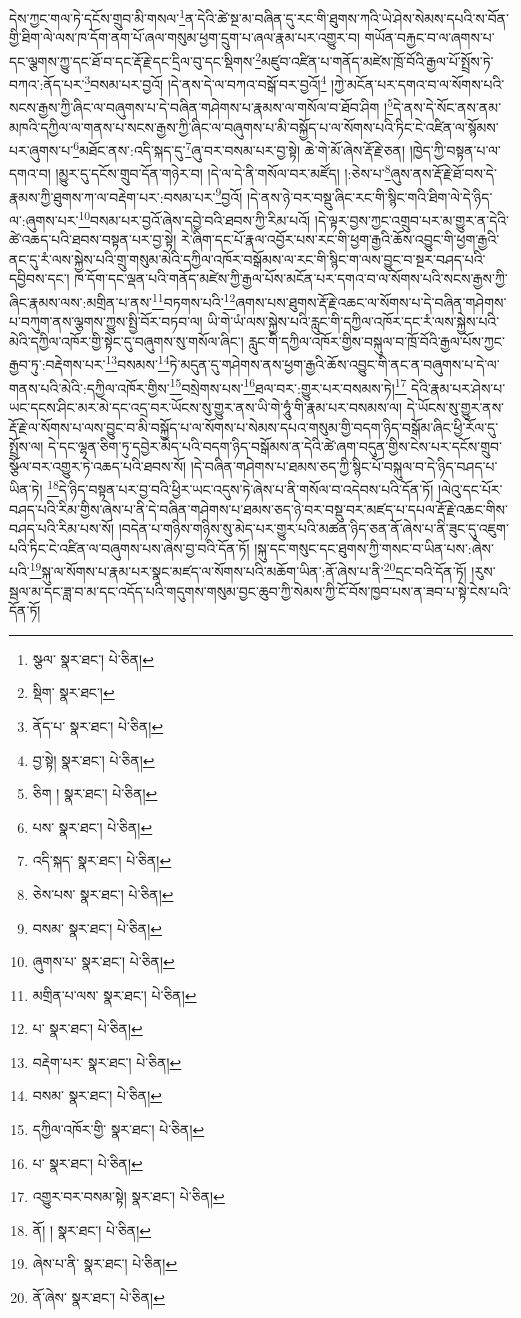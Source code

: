 དེས་ཀྱང་གལ་ཏེ་དངོས་གྲུབ་མི་གསལ་\footnote{སྩལ་  སྣར་ཐང་།  པེ་ཅིན། }ན་དེའི་ཚེ་སྔ་མ་བཞིན་དུ་རང་གི་ཐུགས་ཀའི་ཡེ་ཤེས་སེམས་དཔའི་ས་བོན་གྱི་ཐིག་ལེ་ལས་ཁ་དོག་ནག་པོ་ཞལ་གསུམ་ཕྱག་དྲུག་པ་ཞལ་རྣམ་པར་འགྱུར་བ། གཡོན་བརྐྱང་བ་ལ་ཞགས་པ་དང་ལྕགས་ཀྱུ་དང་ཐོ་བ་དང་རྡོ་རྗེ་དང་དྲིལ་བུ་དང་སྡིགས་\footnote{སྡིག་  སྣར་ཐང་། }མཛུབ་འཛིན་པ་གནོད་མཛེས་ཁྲོ་བོའི་རྒྱལ་པོ་སྤྲོས་ཏེ་བཀའ་:ནོད་པར་\footnote{ནོད་པ་  སྣར་ཐང་།  པེ་ཅིན། }བསམ་པར་བྱའོ། །དེ་ནས་དེ་ལ་བཀའ་བསྒོ་བར་བྱའོ།\footnote{བྱ་སྟེ།  སྣར་ཐང་།  པེ་ཅིན། } །ཀྱེ་མངོན་པར་དགའ་བ་ལ་སོགས་པའི་སངས་རྒྱས་ཀྱི་ཞིང་ལ་བཞུགས་པ་དེ་བཞིན་གཤེགས་པ་རྣམས་ལ་གསོལ་བ་ཐོབ་ཤིག །\footnote{ཅིག །  སྣར་ཐང་།  པེ་ཅིན། }དེ་ནས་དེ་སོང་ནས་ནམ་མཁའི་དཀྱིལ་ལ་གནས་པ་སངས་རྒྱས་ཀྱི་ཞིང་ལ་བཞུགས་པ་མི་བསྐྱོད་པ་ལ་སོགས་པའི་ཏིང་ངེ་འཛིན་ལ་སྙོམས་པར་ཞུགས་པ་\footnote{པས་  སྣར་ཐང་།  པེ་ཅིན། }མཐོང་ནས་:འདི་སྐད་དུ་\footnote{འདི་སྐད་  སྣར་ཐང་།  པེ་ཅིན། }ཞུ་བར་བསམ་པར་བྱ་སྟེ། ཆེ་གེ་མོ་ཞེས་རྡོ་རྗེ་ཅན། །ཁྱེད་ཀྱི་བསྟན་པ་ལ་དགའ་བ། །མྱུར་དུ་དངོས་གྲུབ་དོན་གཉེར་བ། །དེ་ལ་དེ་ནི་གསོལ་བར་མཛོད། །:ཅེས་པ་\footnote{ཅེས་པས་  སྣར་ཐང་།  པེ་ཅིན། }ཞུས་ནས་རྡོ་རྗེ་ཐོ་བས་དེ་རྣམས་ཀྱི་ཐུགས་ཀ་ལ་བརྡེག་པར་:བསམ་པར་\footnote{བསམ་  སྣར་ཐང་།  པེ་ཅིན། }བྱའོ། །དེ་ནས་ཉེ་བར་བསྡུ་ཞིང་རང་གི་སྙིང་གའི་ཐིག་ལེ་དེ་ཉིད་ལ་:ཞུགས་པར་\footnote{ཞུགས་པ་  སྣར་ཐང་།  པེ་ཅིན། }བསམ་པར་བྱའོ་ཞེས་དབྱེ་བའི་ཐབས་ཀྱི་རིམ་པའོ། །དེ་ལྟར་བྱས་ཀྱང་འགྲུབ་པར་མ་གྱུར་ན་དེའི་ཚེ་འཆད་པའི་ཐབས་བསྟན་པར་བྱ་སྟེ། རེ་ཞིག་དང་པོ་རྣལ་འབྱོར་པས་རང་གི་ཕྱག་རྒྱའི་ཆོས་འབྱུང་གི་ཕྱག་རྒྱའི་ནང་དུ་རཾ་ལས་སྐྱེས་པའི་གྲུ་གསུམ་མེའི་དཀྱིལ་འཁོར་བསྒོམས་ལ་རང་གི་སྙིང་ག་ལས་བྱུང་བ་སྔར་བཤད་པའི་དབྱིབས་དང་། ཁ་དོག་དང་ལྡན་པའི་གནོད་མཛེས་ཀྱི་རྒྱལ་པོས་མངོན་པར་དགའ་བ་ལ་སོགས་པའི་སངས་རྒྱས་ཀྱི་ཞིང་རྣམས་ལས་:མགྲིན་པ་ནས་\footnote{མགྲིན་པ་ལས་  སྣར་ཐང་།  པེ་ཅིན། }བཏགས་པའི་\footnote{པ་  སྣར་ཐང་།  པེ་ཅིན། }ཞགས་པས་ཐུགས་རྡོ་རྗེ་འཆང་ལ་སོགས་པ་དེ་བཞིན་གཤེགས་པ་བཀུག་ནས་ལྕགས་ཀྱུས་སྤྱི་བོར་བཏབ་ལ། ཡི་གེ་ཡཾ་ལས་སྐྱེས་པའི་རླུང་གི་དཀྱིལ་འཁོར་དང་རཾ་ལས་སྐྱེས་པའི་མེའི་དཀྱིལ་འཁོར་གྱི་སྟེང་དུ་བཞུགས་སུ་གསོལ་ཞིང་། རླུང་གི་དཀྱིལ་འཁོར་གྱིས་བསྐུལ་བ་ཁྲོ་བོའི་རྒྱལ་པོས་ཀྱང་རྒྱབ་ཏུ་:བརྡེགས་པར་\footnote{བརྡེག་པར་  སྣར་ཐང་།  པེ་ཅིན། }བསམས་\footnote{བསམ་  སྣར་ཐང་།  པེ་ཅིན། }ཏེ་མདུན་དུ་གཤེགས་ནས་ཕྱག་རྒྱའི་ཆོས་འབྱུང་གི་ནང་ན་བཞུགས་པ་དེ་ལ་གནས་པའི་མེའི་:དཀྱིལ་འཁོར་གྱིས་\footnote{དཀྱིལ་འཁོར་གྱི་  སྣར་ཐང་།  པེ་ཅིན། }བསྲེགས་པས་\footnote{པ་  སྣར་ཐང་།  པེ་ཅིན། }ཐལ་བར་:གྱུར་པར་བསམས་ཏེ།\footnote{འགྱུར་བར་བསམ་སྟེ།  སྣར་ཐང་།  པེ་ཅིན། } དེའི་རྣམ་པར་ཤེས་པ་ཡང་དངས་ཤིང་མར་མེ་དང་འདྲ་བར་ཡོངས་སུ་གྱུར་ནས་ཡི་གེ་ཧཱུཾ་གི་རྣམ་པར་བསམས་ལ། དེ་ཡོངས་སུ་གྱུར་ནས་རྡོ་རྗེ་ལ་སོགས་པ་ལས་བྱུང་བ་མི་བསྐྱོད་པ་ལ་སོགས་པ་སེམས་དཔའ་གསུམ་གྱི་བདག་ཉིད་བསྒོམ་ཞིང་ཕྱི་རོལ་དུ་སྤྲོས་ལ། དེ་དང་ལྷན་ཅིག་ཏུ་དབྱེར་མེད་པའི་བདག་ཉིད་བསྒོམས་ན་དེའི་ཚེ་ཞག་བདུན་གྱིས་ངེས་པར་དངོས་གྲུབ་སྩོལ་བར་འགྱུར་ཏེ་འཆད་པའི་ཐབས་སོ། །དེ་བཞིན་གཤེགས་པ་ཐམས་ཅད་ཀྱི་སྙིང་པོ་བསྐུལ་བ་དེ་ཉིད་བཤད་པ་ཡིན་ཏེ། \footnote{ནོ། །   སྣར་ཐང་།  པེ་ཅིན། }དེ་ཉིད་བསྟན་པར་བྱ་བའི་ཕྱིར་ཡང་འདུས་ཏེ་ཞེས་པ་ནི་གསོལ་བ་འདེབས་པའི་དོན་ཏོ། །ལེའུ་དང་པོར་བཤད་པའི་རིམ་གྱིས་ཞེས་པ་ནི་དེ་བཞིན་གཤེགས་པ་ཐམས་ཅད་ཉེ་བར་བསྡུ་བར་མཛད་པ་དཔལ་རྡོ་རྗེ་འཆང་གིས་བཤད་པའི་རིམ་པས་སོ། །བདེན་པ་གཉིས་གཉིས་སུ་མེད་པར་གྱུར་པའི་མཚན་ཉིད་ཅན་ནོ་ཞེས་པ་ནི་ཟུང་དུ་འཇུག་པའི་ཏིང་ངེ་འཛིན་ལ་བཞུགས་པས་ཞེས་བྱ་བའི་དོན་ཏོ། །སྐུ་དང་གསུང་དང་ཐུགས་ཀྱི་གསང་བ་ཡིན་པས་:ཞེས་པའི་\footnote{ཞེས་པ་ནི་  སྣར་ཐང་།  པེ་ཅིན། }སྐུ་ལ་སོགས་པ་རྣམ་པར་སྣང་མཛད་ལ་སོགས་པའི་མཆོག་ཡིན་:ནོ་ཞེས་པ་ནི་\footnote{ནོ་ཞེས་  སྣར་ཐང་།  པེ་ཅིན། }དྲང་བའི་དོན་ཏོ། །རུས་སྦལ་མ་དང་ཟླ་བ་མ་དང་འདོད་པའི་གདུགས་གསུམ་བྱང་ཆུབ་ཀྱི་སེམས་ཀྱི་ངོ་བོས་ཁྱབ་པས་ན་ཟབ་པ་སྟེ་ངེས་པའི་དོན་ཏོ། 